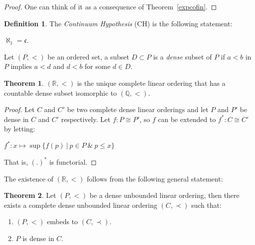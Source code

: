 \documentclass[8pt]{article}
\theoremstyle{definition}
\newtheorem{definition}{Definition}[section]
\theoremstyle{definition}
\newtheorem{theorem}{Theorem}[section]
\theoremstyle{definition}
\theoremstyle{definition}
\theoremstyle{definition}
\theoremstyle{definition}
\theoremstyle{definition}
\theoremstyle{definition}
\theoremstyle{definition}
\theoremstyle{definition}
\theoremstyle{definition}
\theoremstyle{definition}
\theoremstyle{definition}
\theoremstyle{definition}
\theoremstyle{question}
\begin{document}
\begin{proof}
  One can think of it as a consequence of Theorem~\ref{expcofin}.
\end{proof}

\begin{definition} The \emph{Continuum Hypothesis} (CH) is the following statement:

  \begin{center}
    $\aleph_1 = \mathfrak{c}$.
  \end{center}
\end{definition}

Let $(P, <)$ be an ordered set, a subset $D \subset P$ is a \emph{dense} 
subset of $P$ if $a < b$ in $P$ implies $a < d$ and $d < b$ for some $d \in D$.

\begin{theorem}
  $(\mathbb{R}, <)$ is the unique complete linear ordering that has a 
  countable dense subset isomorphic to $(\mathbb{Q}, <)$.
\end{theorem}

\begin{proof}

  Let $C$ and $C'$ be two complete dense linear orderings and let 
  $P$ and $P'$ be dense in $C$ and $C'$ respectively. 
  Let $f : P \cong P'$, so $f$ can be extended to $f^* : C \cong C'$ by letting:

  \begin{center}
    $f^* : x \mapsto \sup \{ f(p) \: | \: p \in P \: \& \: p \leq x \}$
  \end{center}

  That is, ${(.)}^*$ is functorial.
\end{proof}

The existence of $(\mathbb{R}, <)$ follows from the following general statement:
\begin{theorem}
  Let $(P, <)$ be a dense unbounded linear ordering, then there exists a complete dense unbounded linear ordering 
  $(C, \prec)$ such that:

  \begin{enumerate}
    \item $(P, <)$ embeds to $(C, \prec)$.
    \item $P$ is dense in $C$.
  \end{enumerate}
\end{theorem}
\end{document}
